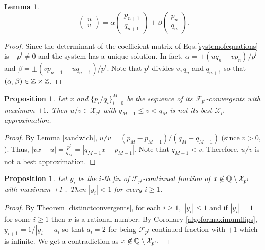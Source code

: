 \documentclass[12pt]{elsarticle}
\newtheorem{lemma}[theorem]{Lemma}
\newtheorem{proposition}[theorem]{Proposition}
\theoremstyle{definition}
\newcommand{\mX}{{\mathcal X}}
\newcommand{\f}{{\mathcal F}}
\begin{document}
{\begin{lemma}
  		\begin{equation}\label{systemofequations}
  		\begin{pmatrix} u\\v \end{pmatrix}= \alpha \begin{pmatrix} p_{n+1}\\q_{n+1}\end{pmatrix}+\beta\begin{pmatrix} p_n\\q_n\end{pmatrix}.
  		\end{equation}
  	\end{lemma}
  	\begin{proof} Since the determinant of the coefficient matrix of Eqs.\eqref{systemofequations} is $\pm p^l\ne0$ and the system has a unique solution. In fact, $\alpha=\pm (uq_n-vp_n)/p^l$ and
  		$\beta=\pm (vp_{n+1}-uq_{n+1})/p^l$. Note that $p^l$ divides $v,q_n$ and $q_{n+1}$ so that $(\alpha,\beta)\in\mathbb{Z}\times\mathbb{Z}$.
  	\end{proof}
  	
  	\begin{proposition}\label{appposition}
  		Let $x$ and $\{p_i/q_i\}_{i=0}^M$ be the sequence of its $\f_{p^l}$-convergents with maximum $+1.$ Then $u/v\in \mX_{p^l}$ with $q_{M-1}\le v<q_M$ is not its best $\mX_{p^l}$-approximation. 
  	\end{proposition}
  \begin{proof}
  	By Lemma \ref{sandwich},  $u/v=(p_{M}-p_{M-1})/(q_{M}-q_{M-1})$ (since $v>0,$ ). Thus, $|vx-u|=\frac{p^l}{q_M}=|q_{M-1}x-p_{M-1}|$. Note that $q_{M-1}<v$. Therefore, $u/v$ is not a best approximation.
  \end{proof}
  		\begin{proposition}\label{tail1}
  		Let $y_i$ be the $i$-th fin  of  $\f_{p^l}$-continued fraction of $x\not\in\Q\setminus\mX_{p^l}$ with maximum +1 . Then $|y_i|<1$ for every $i\ge1$.
  		\end{proposition}
  		\begin{proof}
  			By Theorem \ref{distinctconvergents}, for each $i\ge1,$ $|y_i|\le1$  and if $|y_i|=1$ for some $i\ge1$ then $x$ is a rational number. 
  		  By Corollary \ref{algoformaximumflips}, $y_{i+1}=1/|y_i|-a_i$ so that  $a_i=2$ for being $\f_{p^l}$-continued fraction with $+1$ which is infinite. We get a contradiction as $x\not\in\Q\setminus\mX_{p^l}.$
  		\end{proof}
  	
}
\end{document}
